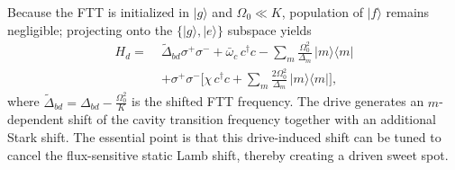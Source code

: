 Because the FTT is initialized in $|g\rangle$ and $\Omega_0\ll K$, population of $|f\rangle$ remains negligible; projecting onto the $\{|g\rangle,|e\rangle\}$ subspace yields
\begin{equation}
\label{eq:Hd_two_level}
\begin{aligned}
H_d=\;&\widetilde{\Delta}_{bd}\sigma^+\sigma^-
+\bar\omega_c\,c^\dagger c
-\sum_m \frac{\Omega_0^2}{\Delta_m}\,|m\rangle\langle m| \\
&+\sigma^+\sigma^-\!\Biggl[
\chi\,c^\dagger c
+\sum_m \frac{2\Omega_0^2}{\Delta_m}\,|m\rangle\langle m|
\Biggr],
\end{aligned}
\end{equation}
where $\widetilde{\Delta}_{bd} = \Delta_{bd}-\frac{\Omega_0^2}{K}$ is the shifted FTT frequency. The drive generates an $m$-dependent shift of the cavity transition frequency together with an additional Stark shift. The essential point is that this drive-induced shift can be tuned to cancel the flux-sensitive static Lamb shift, thereby creating a driven sweet spot.

